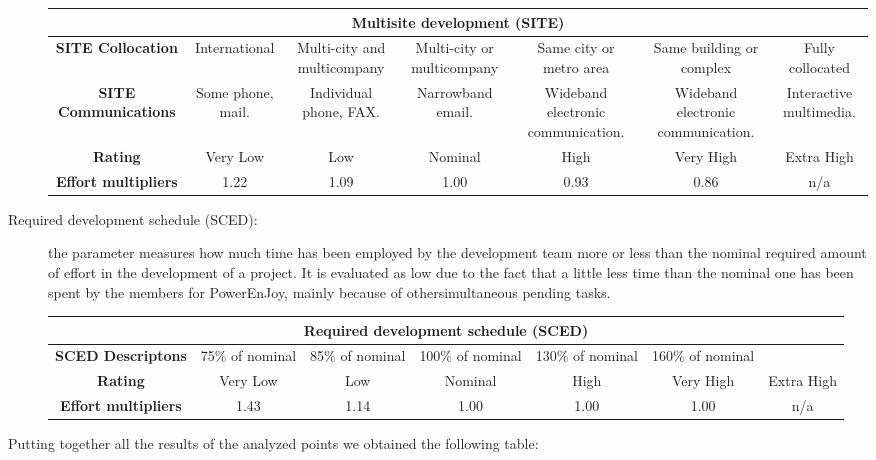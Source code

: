 \begin{description}
\begin{tabular}{ | c | c | c | c | c | c | c | }
\hline
         \multicolumn{7}{|c|}{\textbf{Multisite development (SITE)}} \\ \hline  \hline
         	\textbf{SITE Collocation} &International&Multi-city and multicompany& Multi-city or multicompany& Same city or metro area&Same building or complex&Fully collocated\\ \hline
         	\textbf{SITE Communications} &Some phone, mail.&Individual phone, FAX.& Narrowband email.& Wideband electronic communication.&Wideband electronic communication.& Interactive multimedia.\\ \hline
	\textbf{Rating}&Very Low & Low & Nominal  & High & Very High &Extra High\\ \hline
	\textbf{Effort multipliers} & 1.22 & 1.09 & 1.00 & 0.93 & 0.86 & n/a \\ \hline
\end{tabular}	

\item[Required development schedule (SCED):] the parameter measures how much time has been employed by the development team more or less than the nominal required amount of effort in the development of a project. It is evaluated as low due to the fact that a little less time than the nominal one has been spent by the members for PowerEnJoy, mainly because of othersimultaneous pending tasks.

\begin{tabular}{ | c | c | c | c | c | c | c | }
\hline
         \multicolumn{7}{|c|}{\textbf{Required development schedule (SCED)}} \\ \hline  \hline
         	\textbf{SCED Descriptons} &75\% of nominal &85\% of nominal &100\% of nominal &130\% of nominal &160\% of nominal &\\ \hline
	\textbf{Rating}&Very Low & Low & Nominal  & High & Very High &Extra High\\ \hline
	\textbf{Effort multipliers} & 1.43 & 1.14 & 1.00 & 1.00 &  1.00 & n/a \\ \hline
\end{tabular}
\end{description}

Putting together all the results of the analyzed points we obtained the following table:

